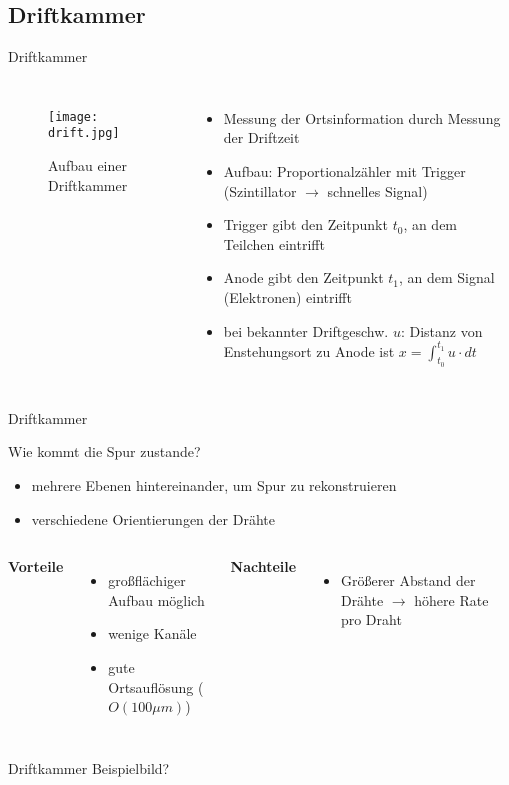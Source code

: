 \subsection[]{Driftkammer}

\begin{frame}{Driftkammer}
    \begin{columns}[T]
			\begin{figure}[htbp]
			  \centering
			  \texttt{[image: drift.jpg]}
			  \caption{Aufbau einer Driftkammer}
			\end{figure}
			
	    	\begin{itemize}
	    	  \item Messung der Ortsinformation durch Messung der Driftzeit
			  \item Aufbau: Proportionalzähler mit Trigger (Szintillator $\rightarrow$ schnelles Signal)
			  \item Trigger gibt den Zeitpunkt $t_0$, an dem Teilchen eintrifft
			  \item Anode gibt den Zeitpunkt $t_1$, an dem Signal (Elektronen) eintrifft
			  \item bei bekannter Driftgeschw. $u$: Distanz von Enstehungsort zu Anode ist
			  $x=\int_{t_0}^{t_1}u\cdot dt$
			\end{itemize}
			
    \end{columns}
\end{frame}

\begin{frame}{Driftkammer}

	\begin{block}{Wie kommt die Spur zustande?}
		\begin{itemize}
		  \item mehrere Ebenen hintereinander, um Spur zu rekonstruieren
		  \item verschiedene Orientierungen der Drähte
		\end{itemize}
	\end{block}
	\vspace{0.8cm}
    \begin{columns}[T]
			\textbf{Vorteile}		
			\begin{itemize}
			  \item großflächiger Aufbau möglich
			  \item wenige Kanäle
			  \item gute Ortsauflösung ($O(100\mu m)$)
			\end{itemize}	
	    	\textbf{Nachteile}
	    	\begin{itemize}
			  \item Größerer Abstand der Drähte $\rightarrow$ höhere Rate pro Draht 
			\end{itemize}
    \end{columns}
    \vspace{1cm}
\end{frame}

\begin{frame}{Driftkammer}
    Beispielbild?
\end{frame}
